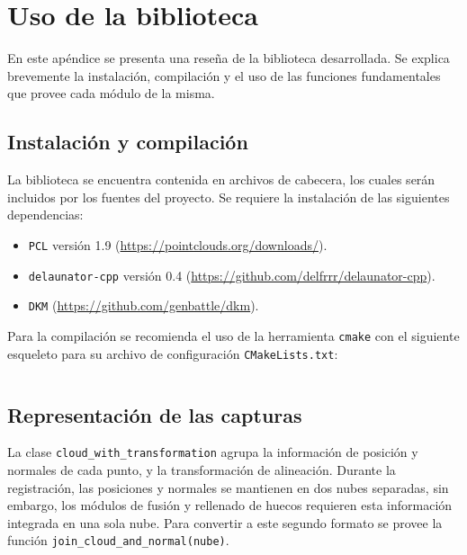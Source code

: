 \chapter{Uso de la biblioteca}
En este apéndice se presenta una reseña de la biblioteca desarrollada.
Se explica brevemente la instalación, compilación y el uso de las funciones fundamentales
que provee cada módulo de la misma.

	\section{Instalación y compilación}
	La biblioteca se encuentra contenida en archivos de cabecera, los cuales serán incluidos por los fuentes del proyecto.
	Se requiere la instalación de las siguientes dependencias:
	\begin{itemize}
		\item \texttt{PCL} versión 1.9 (\url{https://pointclouds.org/downloads/}).
		\item \texttt{delaunator-cpp} versión 0.4 (\url{https://github.com/delfrrr/delaunator-cpp}).
		\item \texttt{DKM} (\url{https://github.com/genbattle/dkm}).
	\end{itemize}

	Para la compilación se recomienda el uso de la herramienta \texttt{cmake} con el siguiente esqueleto para su archivo de configuración \texttt{CMakeLists.txt}:
	\inputminted{cmake}{code/CMakeLists.txt}

	\section{Representación de las capturas}
		La clase \verb|cloud_with_transformation|
			agrupa la información de posición y normales de cada punto,
			y la transformación de alineación.
			Durante la registración, las posiciones y normales se mantienen en dos nubes separadas,
			sin embargo, los módulos de fusión y rellenado de huecos
			requieren esta información integrada en una sola nube.
			Para convertir a este segundo formato se provee la función 
			\texttt{join_cloud_and_normal(nube)}.

